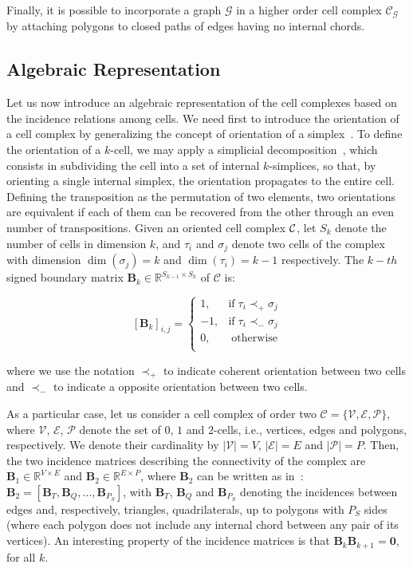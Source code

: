 \documentclass{article}
\def\mB{{\bm{B}}}
\def\mB{\mbox{$\mathbf{B}$}}
\newcommand{\beq}{\begin{equation}}
\newcommand{\eeq}{\end{equation}}
\begin{document}
Finally, it is possible to incorporate a graph $\mathcal{G}$ in a higher order cell complex $\mathcal{C}_\mathcal{G}$ by attaching polygons to closed paths of edges having no internal chords. 

\subsection{Algebraic Representation}

Let us now introduce an algebraic representation of the cell complexes based on the incidence relations among cells. We need first to introduce
the orientation of a cell complex
by generalizing the concept of orientation of a simplex~\cite{bodnar2021weisfeiler, grady2010discrete}. To define the orientation of a $k$-cell, we may apply a simplicial decomposition~\cite{grady2010discrete}, which consists in  subdividing the cell into a set of internal $k$-simplices, so that, by orienting a single internal simplex, the orientation propagates to the entire cell. Defining the transposition as the permutation of two elements, two orientations are equivalent if each of them can be recovered from the other through an even number of transpositions. 
Given an oriented cell complex ${\cal C}$, let ${S}_{k}$ denote the number of cells in dimension $k$, and $\tau_i$ and $\sigma_j$ denote two cells of the complex with dimension $\dim(\sigma_j) = k$ and $\dim(\tau_i) = k-1$ respectively. 
The $k-th$ signed boundary matrix $\mathbf{B}_{k} \in \mathbb{R}^{S_{k-1} \times S_{k}}$ of ${\mathcal{C}}$ is:


  \beq \label{inc_coeff}
  [\mathbf{B}_k]_{i,j}=\left\{\begin{array}{rll}
  1, & \text{if} \; \tau_i \prec_{+} \sigma_j \\
  -1,& \text{if} \; \tau_i \prec_{-} \sigma_j\\
  0,&  \; \text{otherwise}\\
  \end{array}\right. 
  \eeq
 
where we use the notation $\prec_{+}$ to indicate coherent orientation between two cells and $\prec_{-}$
to indicate a opposite orientation between two cells. 

As a particular case, let us consider a cell complex of order two  $\mathcal{C}=\{\mathcal{V},\mathcal{E},\mathcal{P}\}$, where $\mathcal{V}$, $\mathcal{E}$, $\mathcal{P}$ denote the set of  $0$, $1$ and $2$-cells, i.e., vertices, edges and polygons, respectively. We denote their cardinality by $|\mathcal{V}|=V$, $|\mathcal{E}|=E$ and $|\mathcal{P}|=P$. Then, the two incidence matrices describing the connectivity of the complex are $\mB_1 \in \mathbb{R}^{V\times E}$ and $\mB_2 \in \mathbb{R}^{E\times P}$, where $\mB_2$ can be written as in~\cite{sardellitti2022cell}: $\mB_2=[\mB_{T},\mB_{Q},\ldots,\mB_{P_{S}} ]$, with  $\mB_{T}$, $\mB_{Q}$ and  $\mB_{P_{S}}$ denoting the incidences between edges and, respectively, triangles, quadrilaterals, up to polygons with $P_{S}$ sides (where each polygon does not include any internal chord between any pair of its vertices).  
 An interesting property of the incidence matrices is that $\mB_k \mB_{k+1}=\mathbf{0}$, for all $k$. 
\end{document}
